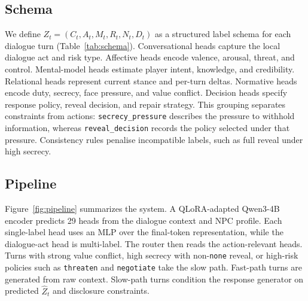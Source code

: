 \documentclass[11pt]{article}
\begin{document}
\subsection{Schema}
\label{sec:schema}

We define $Z_t=(C_t,A_t,M_t,R_t,N_t,D_t)$ as a structured label schema for each dialogue turn (Table~\ref{tab:schema}). Conversational heads capture the local dialogue act and risk type. Affective heads encode valence, arousal, threat, and control. Mental-model heads estimate player intent, knowledge, and credibility. Relational heads represent current stance and per-turn deltas. Normative heads encode duty, secrecy, face pressure, and value conflict. Decision heads specify response policy, reveal decision, and repair strategy. This grouping separates constraints from actions: \texttt{secrecy\_pressure} describes the pressure to withhold information, whereas \texttt{reveal\_decision} records the policy selected under that pressure. Consistency rules penalise incompatible labels, such as full reveal under high secrecy.

\begin{table}[t]
\centering
\caption{Structured social state $Z_t$. Relational stance contains six dimensions, each with a level and delta head.}
\label{tab:schema}
\small
{}
\end{table}

\subsection{Pipeline}
\label{sec:architectures}

Figure~\ref{fig:pipeline} summarizes the system. A QLoRA-adapted Qwen3-4B encoder predicts 29 heads from the dialogue context and NPC profile. Each single-label head uses an MLP over the final-token representation, while the dialogue-act head is multi-label. The router then reads the action-relevant heads. Turns with strong value conflict, high secrecy with non-\texttt{none} reveal, or high-risk policies such as \texttt{threaten} and \texttt{negotiate} take the slow path. Fast-path turns are generated from raw context. Slow-path turns condition the response generator on predicted $\hat{Z}_t$ and disclosure constraints.
\end{document}
